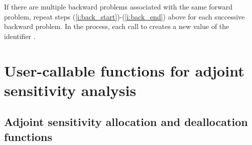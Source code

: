 If there are multiple backward problems associated with the same forward problem,
repeat steps (\ref{i:back_start})-(\ref{i:back_end}) above for each successive
backward problem.  In the process, each call to  creates a new
value of the identifier .

\section{User-callable functions for adjoint sensitivity analysis}

\subsection{Adjoint sensitivity allocation and deallocation functions}
\label{sss:idaadjinit}

